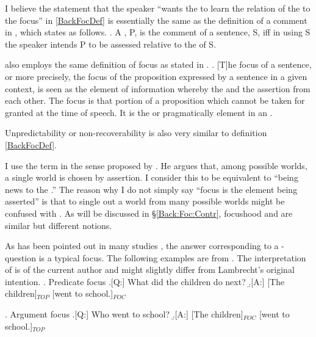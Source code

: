 I believe the statement that the speaker ``wants the  to learn the relation of the  to the focus'' in \ref{BackFocDef} is essentially the same as the definition of a comment in ,
which states as follows.
%
\ex. A , P, is the comment of a sentence, S, iff in using S the speaker intends P to be assessed relative to the  of S.
     \hfill{\cite[210]{gundel88}}

 \cite[based on][]{halliday67} also employs the same definition of focus as stated in \Next.
%
\ex. [T]he focus of a sentence, or more precisely,
  the focus of the proposition expressed by a sentence
  in a given  context,
  is seen as the element of information whereby the  
  and the assertion  from each other.
  The focus is that portion of a proposition which
  cannot be taken for granted at the time of speech.
  It is the  or pragmatically
   element in an .
  \hfill{\cite[207, underlined by the original author]{lambrecht94}}

Unpredictability or non-recoverability \cite[see also][]{kuno72} is also very similar to definition \ref{BackFocDef}.

I use the term  in the sense proposed by .
He argues that, among possible worlds, a single world is chosen by assertion.
I consider this to be equivalent to ``being news to the .''
The reason why I do not simply say ``focus is the element being asserted'' is that
to single out a world from many possible worlds might be confused with .
As will be discussed in \S \ref{Back:Foc:Contr},
focushood and  are similar but different notions.

As has been pointed out in many studies \cite[e.g.,][]{matsushita28,chomsky65,gundel74},
the answer corresponding to a -question is a typical focus.
The following examples are from .
The interpretation of  is of the current author
and might slightly differ from Lambrecht's original intention.
%
\ex. \label{BackLambPredFoc}{Predicate focus}
	\a.[Q:] What did the children do next?
	\b.[A:] {[The children]$_{TOP}$ [went to school.]$_{FOC}$}

\ex. \label{BackLambArgFoc}{Argument focus}
	\a.[Q:] Who went to school?
	\b.[A:] {[The children]$_{FOC}$ [went to school.]$_{TOP}$}

